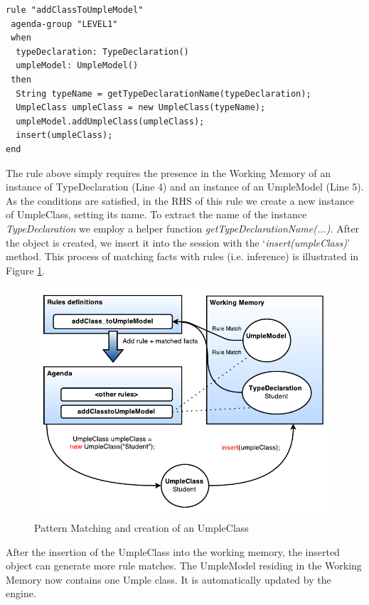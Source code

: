 \begin{lstlisting}[language={drools},label={lst:addClassToUmpleModel}, caption=Rule 'addClassToUmpleModel']
rule "addClassToUmpleModel"
 agenda-group "LEVEL1" 
 when
  typeDeclaration: TypeDeclaration()
  umpleModel: UmpleModel()
 then
  String typeName = getTypeDeclarationName(typeDeclaration);
  UmpleClass umpleClass = new UmpleClass(typeName);
  umpleModel.addUmpleClass(umpleClass);
  insert(umpleClass);
end
\end{lstlisting}

The rule above simply requires the presence in the Working Memory of an instance of TypeDeclaration (Line 4) and an instance of an UmpleModel (Line 5). As the conditions are satisfied, in the RHS of this rule we create a new instance of UmpleClass, setting its name. To extract the name of the instance \textit{TypeDeclaration} we employ a helper function \textit{getTypeDeclarationName(...)}. After the object is created, we insert it into the session with the `\textit{insert(umpleClass)}' method. This process of matching facts with rules (i.e. inference) is illustrated in Figure \ref{fig:ruleModel}.

\begin{figure}[h]
\centering
\includegraphics[width=0.98\textwidth]{Figures/ruleModel.pdf}
\caption{Pattern Matching and creation of an UmpleClass}
\label{fig:ruleModel}
\end{figure}

After the insertion of the UmpleClass into the working memory, the inserted object can generate more rule matches. The UmpleModel residing in the Working Memory now contains one Umple class. It is automatically updated by the engine.

